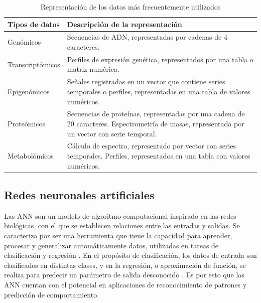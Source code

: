 \begin{table}[!h]
    \scriptsize
    \centering
    \caption{Representación de los datos más frecuentemente utilizados}
    
    \begin{tabular}{
    >{\centering\arraybackslash}m{4cm} 
    >{\centering\arraybackslash}m{9cm}}
\hline 
        \textbf{Tipos de datos} & 
        \textbf{Descripción de la representación} 
\\      
    \hline \hline 

    Genómicos &
    Secuencias de ADN, representadas por cadenas de 4 caracteres.
\\
    \hline
    Transcriptómicos &
    Perfiles de expresión genética, representados por una tabla o matriz numérica.
\\
    \hline
    Epigenómicos &
    Señales registradas en un vector que contiene series temporales o perfiles, representadas en una tabla de valores numéricos.
\\
    \hline
     Proteómicos &
     Secuencias de proteínas, representadas por una cadena de 20 caracteres. Espectrometría de masas, representada por un vector con serie temporal.
\\
     \hline
     Metabolómicos &
     Cálculo de espectro, representado por vector con series temporales.
     Perfiles, representados en una tabla con valores numéricos.
\\
    
\hline
    \end{tabular}
    \label{tab:Datos_cod}
\end{table}

\subsection{Redes neuronales artificiales}

 Las ANN son un modelo de algoritmo computacional inspirado en las redes biológicas, con el que se establecen relaciones entre las entradas y salidas. Se caracteriza por ser una herramienta que tiene la capacidad para aprender, procesar y generalizar automáticamente datos, utilizadas en tareas de clasificación y regresión \citep{NeuronalNet2014}. En el propósito de clasificación, los datos de entrada son clasificados en distintas clases, y en la regresión, o aproximación de función, se realiza para predecir un parámetro de salida desconocido \citep{NeuronalNet2014}. Es por esto que las ANN cuentan con el potencial en aplicaciones de reconocimiento de patrones y predicción de comportamiento.

